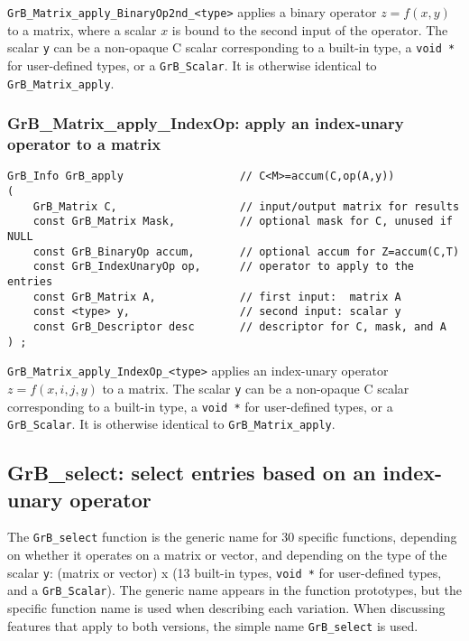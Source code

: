 \documentclass[12pt]{article}
\begin{document}
\verb'GrB_Matrix_apply_BinaryOp2nd_<type>'  applies a binary operator
$z=f(x,y)$ to a matrix, where a scalar $x$ is bound to the second input of the
operator.
The scalar \verb'y' can be a non-opaque C scalar corresponding to a built-in
type, a \verb'void *' for user-defined types, or a \verb'GrB_Scalar'.
It is otherwise identical to \verb'GrB_Matrix_apply'.

\subsubsection{{\sf GrB\_Matrix\_apply\_IndexOp:} apply an index-unary operator to a matrix}
\label{matrix_apply_idxunop}

\begin{mdframed}[userdefinedwidth=6in]
{\footnotesize
\begin{verbatim}
GrB_Info GrB_apply                  // C<M>=accum(C,op(A,y))
(
    GrB_Matrix C,                   // input/output matrix for results
    const GrB_Matrix Mask,          // optional mask for C, unused if NULL
    const GrB_BinaryOp accum,       // optional accum for Z=accum(C,T)
    const GrB_IndexUnaryOp op,      // operator to apply to the entries
    const GrB_Matrix A,             // first input:  matrix A
    const <type> y,                 // second input: scalar y
    const GrB_Descriptor desc       // descriptor for C, mask, and A
) ;
\end{verbatim} } \end{mdframed}

\verb'GrB_Matrix_apply_IndexOp_<type>'  applies an index-unary operator
$z=f(x,i,j,y)$ to a matrix.
The scalar \verb'y' can be a non-opaque C scalar corresponding to a built-in
type, a \verb'void *' for user-defined types, or a \verb'GrB_Scalar'.
It is otherwise identical to \verb'GrB_Matrix_apply'.

\newpage
\subsection{{\sf GrB\_select:} select entries based on an index-unary operator}
\label{select}

The \verb'GrB_select' function is the generic name for 30 specific functions,
depending on whether it operates on a matrix or vector, and depending on the
type of the scalar \verb'y': (matrix or vector) x (13 built-in types,
\verb'void *' for user-defined types, and a \verb'GrB_Scalar').  The generic
name appears in the function prototypes, but the specific function name is used
when describing each variation.  When discussing features that apply to both
versions, the simple name \verb'GrB_select' is used.
\end{document}
